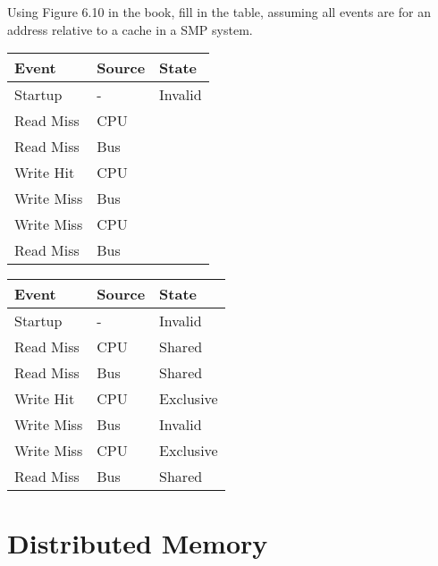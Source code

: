 \begin{example}
Using Figure 6.10 in the book, fill in the table, assuming all events are for an address relative to a cache in a SMP system.

\begin{tabular}{|l|l|l|} \hline
Event      & Source & State   \\ \hline
Startup    & -      & Invalid \\ \hline
Read Miss  & CPU    &         \\ \hline
Read Miss  & Bus    &         \\ \hline
Write Hit  & CPU    &         \\ \hline
Write Miss & Bus    &         \\ \hline
Write Miss & CPU    &         \\ \hline
Read Miss  & Bus    &         \\ \hline
\end{tabular}

{\color{ans}


\begin{tabular}{|l|l|l|} \hline
Event      & Source & State     \\ \hline
Startup    & -      & Invalid   \\ \hline
Read Miss  & CPU    & Shared    \\ \hline
Read Miss  & Bus    & Shared    \\ \hline
Write Hit  & CPU    & Exclusive \\ \hline
Write Miss & Bus    & Invalid   \\ \hline
Write Miss & CPU    & Exclusive \\ \hline
Read Miss  & Bus    & Shared    \\ \hline
\end{tabular}}
\end{example}

\section{Distributed Memory}

